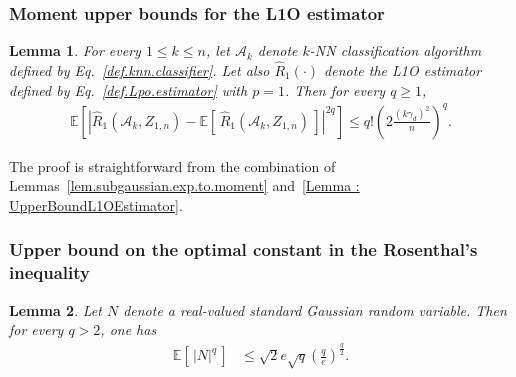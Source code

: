 \documentclass[twoside,11pt]{article}
\numberwithin{equation}{section}
\newtheorem{lem}{Lemma}[section]
\newcommand{\esp}[1]{\mathbb{E}\left[#1 \right]}
\newcommand{\1}{\mathds{1}}%
\newcommand{\paren}[1]{\left( #1 \right)}
\newcommand{\croch}[1]{\left[\, #1 \,\right]}
\newcommand{\abs}[1]{\left\lvert #1 \right\rvert} %
\newcommand{\E}{\mathbb{E}}
\newcommand{\Rh}{\widehat{R}}
\newcommand{\A}{\mathcal{A}}
\numberwithin{equation}{section}
\theoremstyle{plain}
\begin{document}
\subsubsection{Moment upper bounds for the L1O estimator}

\begin{lem}\label{Lemma : MomentUpperBoundL1OEstimator}
	For every $1\leq k \leq n$, let $\A_k$ denote $k$-NN classification algorithm defined by Eq.~\eqref{def.knn.classifier}. Let also $\Rh_1(\cdot)$ denote the L1O estimator defined by Eq.~\eqref{def.Lpo.estimator} with $p=1$.
	Then for every $q\geq 1$,
\begin{eqnarray}\label{ineq.moment.pair_L1o}
  \esp{ \abs{ \Rh_1\paren{ \A_k,Z_{1,n}} - \E\croch{\Rh_1\paren{ \A_k,Z_{1,n}}}   }^{2q} } \leq q! \paren{ 2 \frac{\paren{k\gamma_d}^2}{n} }^q .
\end{eqnarray}
\end{lem}
The proof is straightforward from the combination of Lemmas~\ref{lem.subgaussian.exp.to.moment} and~\ref{Lemma : UpperBoundL1OEstimator}.






\subsubsection{Upper bound on the optimal constant in the Rosenthal's inequality}



\begin{lem}\label{lem.moment.gaussian}
%
  Let $N$ denote a real-valued standard Gaussian random variable.
%
Then for every $q>2$, one has
\begin{align*}
  \E\croch{ \abs{N}^q } & \leq \sqrt{2} e \sqrt{q} \paren{ \frac{q}{e} }^{\frac{q}{2}} .
\end{align*}

\end{lem}
\end{document}
